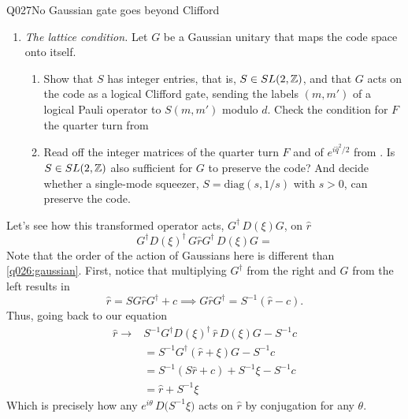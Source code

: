 \begin{entry}{Q027}{No Gaussian gate goes beyond Clifford}
\begin{problem}
\begin{enumerate}[label=\textbf{(\alph*)},leftmargin=*]
  \item \emph{The lattice condition.} Let $G$ be a Gaussian unitary that maps the code
        space onto itself.
        \begin{enumerate}[label=(\roman*)]
          \item Show that $S$ has integer entries, that is, $S\in SL(2,\mathbb{Z})$, and that $G$
                acts on the code as a logical Clifford gate, sending the labels $(m,m')$ of
                a logical Pauli operator to $S(m,m')$ modulo $d$. Check the condition for $F$ the quarter turn from 
          \item Read off the integer matrices of the quarter turn $F$ and of
                $e^{i\hat q^{2}/2}$ from . Is
                $S\in SL(2,\mathbb{Z})$ also sufficient for $G$ to preserve the code? And decide whether a single-mode
                squeezer, $S=\mathrm{diag}(s,1/s)$ with $s>0$, can preserve the code.
        \end{enumerate}

\end{enumerate}
\end{problem}

\begin{solution}[Part (a)]
Let's see how this transformed operator acts, $G^\dagger\,D(\xi) G$, on $\hat{r}$ 
\begin{equation}
   G^\dagger D(\xi)^\dagger\, G\hat r G^\dagger\,D(\xi) G = 
\end{equation}
Note that the order of the action of Gaussians here is different than \eqref{q026:gaussian}. First, notice that multiplying $G^\dagger$ from the right and $G$ from the left results in
\begin{equation}
    \hat r = S G\hat r G^\dagger +c \implies G\hat r G^\dagger = S^{-1} (\hat r - c).
\end{equation}
Thus, going back to our equation 
\begin{equation}
\begin{split}
    \hat r \rightarrow& S^{-1} G^\dagger D(\xi)^\dagger\,  \hat r \,D(\xi) G -  S^{-1}c \\
    &=  S^{-1} G^\dagger   (\hat r +\xi) G -  S^{-1}c\\
    &=  S^{-1} \left(S\hat r+c\right) +S^{-1}\xi -  S^{-1}c\\
    &=  \hat r +S^{-1}\xi 
\end{split} 
\end{equation}
Which is precisely how any $e^{i\theta}\,D\bigl(S^{-1}\xi\bigr)$ acts on $\hat r$ by conjugation for any $\theta$. 


\end{solution}
\end{entry}
